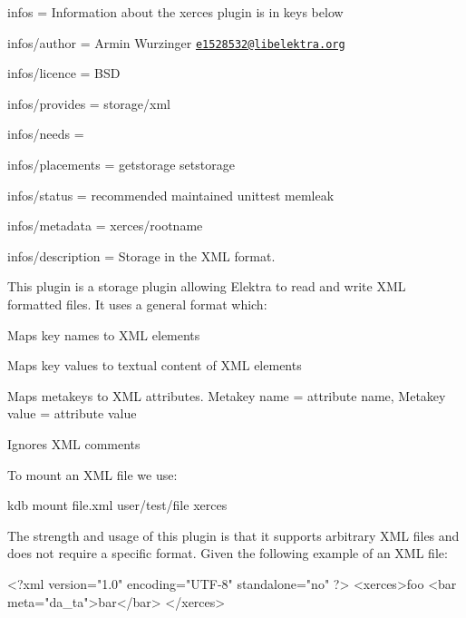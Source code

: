 
\begin{DoxyItemize}
\item infos = Information about the xerces plugin is in keys below
\item infos/author = Armin Wurzinger \href{mailto:e1528532@libelektra.org}{\tt e1528532@libelektra.\+org}
\item infos/licence = B\+SD
\item infos/provides = storage/xml
\item infos/needs =
\item infos/placements = getstorage setstorage
\item infos/status = recommended maintained unittest memleak
\item infos/metadata = xerces/rootname
\item infos/description = Storage in the X\+ML format.
\end{DoxyItemize}

This plugin is a storage plugin allowing Elektra to read and write X\+ML formatted files. It uses a general format which\+:


\begin{DoxyItemize}
\item Maps key names to X\+ML elements
\item Maps key values to textual content of X\+ML elements
\item Maps metakeys to X\+ML attributes. Metakey name = attribute name, Metakey value = attribute value
\item Ignores X\+ML comments
\end{DoxyItemize}

To mount an X\+ML file we use\+:


\begin{DoxyCode}
kdb mount file.xml user/test/file xerces
\end{DoxyCode}


The strength and usage of this plugin is that it supports arbitrary X\+ML files and does not require a specific format. Given the following example of an X\+ML file\+:


\begin{DoxyCode}
<?\textcolor{keyword}{xml} \textcolor{keyword}{version}=\textcolor{stringliteral}{"1.0"} \textcolor{keyword}{encoding}=\textcolor{stringliteral}{"UTF-8"} \textcolor{keyword}{standalone}=\textcolor{stringliteral}{"no"} ?>
<\textcolor{keywordtype}{xerces}>\textcolor{keyword}{foo}
  <\textcolor{keywordtype}{bar} \textcolor{keyword}{meta}=\textcolor{stringliteral}{"da\_ta"}>\textcolor{keyword}{bar}</\textcolor{keywordtype}{bar}>
</\textcolor{keywordtype}{xerces}>
\end{DoxyCode}



